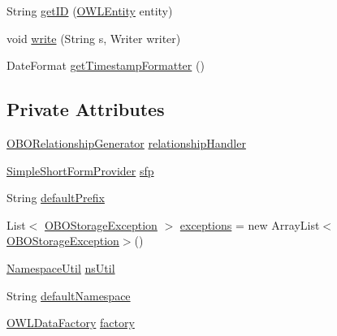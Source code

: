 \begin{DoxyCompactItemize}
\item 
String \hyperlink{classorg_1_1coode_1_1owlapi_1_1obo_1_1renderer_1_1_o_b_o_flat_file_renderer_a26d1a4a104e12dde42e233bac9157d99}{get\-I\-D} (\hyperlink{interfaceorg_1_1semanticweb_1_1owlapi_1_1model_1_1_o_w_l_entity}{O\-W\-L\-Entity} entity)
\item 
void \hyperlink{classorg_1_1coode_1_1owlapi_1_1obo_1_1renderer_1_1_o_b_o_flat_file_renderer_a8239c5726cc5e0dda7bbebe75d9ed9cd}{write} (String s, Writer writer)
\item 
Date\-Format \hyperlink{classorg_1_1coode_1_1owlapi_1_1obo_1_1renderer_1_1_o_b_o_flat_file_renderer_ad1c87e53200f23019ce4959622f95a5b}{get\-Timestamp\-Formatter} ()
\end{DoxyCompactItemize}
\subsection*{Private Attributes}
\begin{DoxyCompactItemize}
\item 
\hyperlink{classorg_1_1coode_1_1owlapi_1_1obo_1_1renderer_1_1_o_b_o_relationship_generator}{O\-B\-O\-Relationship\-Generator} \hyperlink{classorg_1_1coode_1_1owlapi_1_1obo_1_1renderer_1_1_o_b_o_flat_file_renderer_aa2fdd44e578b0c5ae1a9510f55be7507}{relationship\-Handler}
\item 
\hyperlink{classorg_1_1semanticweb_1_1owlapi_1_1util_1_1_simple_short_form_provider}{Simple\-Short\-Form\-Provider} \hyperlink{classorg_1_1coode_1_1owlapi_1_1obo_1_1renderer_1_1_o_b_o_flat_file_renderer_a02105d0908b632eb8292a61e98c8b7c7}{sfp}
\item 
String \hyperlink{classorg_1_1coode_1_1owlapi_1_1obo_1_1renderer_1_1_o_b_o_flat_file_renderer_a6b74c2b84cc72d807f1702577c7010a3}{default\-Prefix}
\item 
List$<$ \hyperlink{classorg_1_1coode_1_1owlapi_1_1obo_1_1renderer_1_1_o_b_o_storage_exception}{O\-B\-O\-Storage\-Exception} $>$ \hyperlink{classorg_1_1coode_1_1owlapi_1_1obo_1_1renderer_1_1_o_b_o_flat_file_renderer_a34d82096e7ac06d2756964cdaf3f412d}{exceptions} = new Array\-List$<$\hyperlink{classorg_1_1coode_1_1owlapi_1_1obo_1_1renderer_1_1_o_b_o_storage_exception}{O\-B\-O\-Storage\-Exception}$>$()
\item 
\hyperlink{classorg_1_1semanticweb_1_1owlapi_1_1util_1_1_namespace_util}{Namespace\-Util} \hyperlink{classorg_1_1coode_1_1owlapi_1_1obo_1_1renderer_1_1_o_b_o_flat_file_renderer_ab07ac9eb18caa7b2e7e38f1a19d716a6}{ns\-Util}
\item 
String \hyperlink{classorg_1_1coode_1_1owlapi_1_1obo_1_1renderer_1_1_o_b_o_flat_file_renderer_ad7e5a179c2a8061bd76dca4269751b1a}{default\-Namespace}
\item 
\hyperlink{interfaceorg_1_1semanticweb_1_1owlapi_1_1model_1_1_o_w_l_data_factory}{O\-W\-L\-Data\-Factory} \hyperlink{classorg_1_1coode_1_1owlapi_1_1obo_1_1renderer_1_1_o_b_o_flat_file_renderer_a523ec763a4bb6c9167be4b2f14d971f5}{factory}
\end{DoxyCompactItemize}


